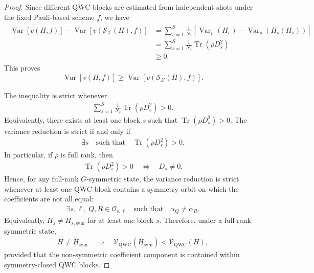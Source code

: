 \documentclass[prl,aps,notitlepage,superscriptaddress,showpacs,nofootinbib]{revtex4-2}
\begin{document}
{\begin{proof}
Since different QWC blocks are estimated from independent shots under the fixed Pauli-based scheme \(f\), we have
\begin{align}
    \begin{aligned}
    \operatorname{Var}[v(H,f)]
    -
    \operatorname{Var}[v(\mathcal S_{\mathcal X}(H),f)]
    &=
    \sum_{s=1}^S
    \frac1{N_s}
    \left[
        \operatorname{Var}_\rho(H_s)
        -
        \operatorname{Var}_\rho(\Pi_s(H_s))
    \right]  \\
    &=
    \sum_{s=1}^S
    \frac1{N_s}
    \operatorname{Tr}(\rho D_s^2) \\
    &\ge 0.
\end{aligned}
\end{align}
This proves
\begin{align}
        \operatorname{Var}[v(H,f)]
    \ge
    \operatorname{Var}[v(\mathcal S_{\mathcal X}(H),f)].
\end{align}

The inequality is strict whenever
\begin{align}
        \sum_{s=1}^S
    \frac1{N_s}
    \operatorname{Tr}(\rho D_s^2)>0.
\end{align}
Equivalently, there exists at least one block \(s\) such that $\operatorname{Tr}(\rho D_s^2)>0.$
The variance reduction is strict if and only if
\begin{align}
       \exists s
    \quad\text{such that}\quad
    \operatorname{Tr}(\rho D_s^2)>0.
\end{align}
In particular, if \(\rho\) is full rank, then
\begin{align}
        \operatorname{Tr}(\rho D_s^2)>0
    \quad\Longleftrightarrow\quad
    D_s\neq 0.
\end{align}
Hence, for any full-rank \(G\)-symmetric state, the variance reduction is strict whenever at least one QWC block contains a symmetry orbit on which the coefficients are not all equal:
\begin{align}
        \exists s,\ell,\ Q,R\in\mathcal O_{s,\ell}
    \quad\text{such that}\quad
    \alpha_Q\neq \alpha_R.
\end{align}
Equivalently, $H_s\neq H_{s,\mathrm{sym}}$
for at least one block \(s\). Therefore, under a full-rank symmetric state,
\begin{align}
        H\neq H_{\mathrm{sym}}
    \quad\Longrightarrow\quad
    \mathcal V_{\mathrm{QWC}}(H_{\mathrm{sym}})
    <
    \mathcal V_{\mathrm{QWC}}(H),
\end{align}
provided that the non-symmetric coefficient component is contained within symmetry-closed QWC blocks.



\end{proof}}
\end{document}
